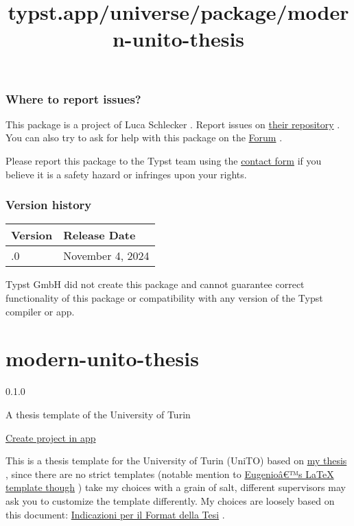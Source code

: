 \subsubsection{Where to report issues?}\label{where-to-report-issues}

This package is a project of Luca Schlecker . Report issues on
\href{https://github.com/luca-schlecker/typst-lambdabus}{their
repository} . You can also try to ask for help with this package on the
\href{https://forum.typst.app}{Forum} .

Please report this package to the Typst team using the
\href{https://typst.app/contact}{contact form} if you believe it is a
safety hazard or infringes upon your rights.

\label{versions}
\subsubsection{Version history}\label{version-history}

\begin{longtable}[]{@{}ll@{}}
\toprule\noalign{}
Version & Release Date \\
\midrule\noalign{}
\endhead
\bottomrule\noalign{}
\endlastfoot
0.1.0 & November 4, 2024 \\
\end{longtable}

Typst GmbH did not create this package and cannot guarantee correct
functionality of this package or compatibility with any version of the
Typst compiler or app.


\title{typst.app/universe/package/modern-unito-thesis}

\label{banner}
\label{template-thumbnail}

\section{modern-unito-thesis}\label{modern-unito-thesis}

{ 0.1.0 }

A thesis template of the University of Turin

\href{/app?template=modern-unito-thesis&version=0.1.0}{Create project in
app}

\label{readme}
This is a thesis template for the University of Turin (UniTO) based on
\href{https://github.com/eduardz1/Bachelor-Thesis}{my thesis} , since
there are no strict templates (notable mention to
\href{https://github.com/esenes/Unito-thesis-template}{Eugenioâ€™s LaTeX
template though} ) take my choices with a grain of salt, different
supervisors may ask you to customize the template differently. My
choices are loosely based on this document:
\href{https://elearning.unito.it/sme/pluginfile.php/29485/mod_folder/content/0/format_TESI_2011-2012.pdf}{Indicazioni
per il Format della Tesi} .

